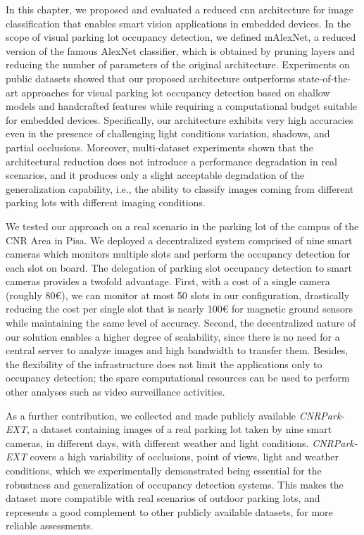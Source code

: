 In this chapter, we proposed and evaluated a reduced \acrlong{cnn} architecture for image classification that enables smart vision applications in embedded devices.
In the scope of visual parking lot occupancy detection, we defined mAlexNet, a reduced version of the famous AlexNet classifier, which is obtained by pruning layers and reducing the number of parameters of the original architecture.
Experiments on public datasets showed that our proposed architecture outperforms state-of-the-art approaches for visual parking lot occupancy detection based on shallow models and handcrafted features while requiring a computational budget suitable for embedded devices.
Specifically, our architecture exhibits very high accuracies even in the presence of challenging light conditions variation, shadows, and partial occlusions.
Moreover, multi-dataset experiments shown that the architectural reduction does not introduce a performance degradation in real scenarios, and it produces only a slight acceptable degradation of the generalization capability, i.e., the ability to classify images coming from different parking lots with different imaging conditions.

We tested our approach on a real scenario in the parking lot of the campus of the CNR Area in Pisa.
We deployed a decentralized system comprised of nine smart cameras which monitors multiple slots and perform the occupancy detection for each slot on board.
The delegation of parking slot occupancy detection to smart cameras provides a twofold advantage.
First, with a cost of a single camera (roughly 80\euro), we can monitor at most 50 slots in our configuration, drastically reducing the cost per single slot that is nearly 100\euro{} for magnetic ground sensors while maintaining the same level of accuracy.
Second, the decentralized nature of our solution enables a higher degree of scalability, since there is no need for a central server to analyze images and high bandwidth to transfer them.
Besides, the flexibility of the infrastructure does not limit the applications only to occupancy detection;
the spare computational resources can be used to perform other analyses such as video surveillance activities.

As a further contribution, we collected and made publicly available \emph{CNRPark-EXT}, a dataset containing images of a real parking lot taken by nine smart cameras, in different days, with different weather and light conditions.
\emph{CNRPark-EXT} covers a high variability of occlusions, point of views, light and weather conditions, which we experimentally demonstrated being essential for the robustness and generalization of occupancy detection systems.
This makes the dataset more compatible with real scenarios of outdoor parking lots, and represents a good complement to other publicly available datasets, for more reliable assessments.

